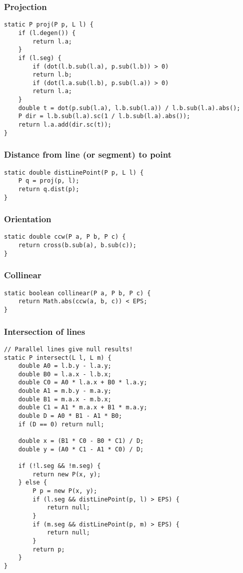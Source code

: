\subsubsection{Projection}
\begin{verbatim}
static P proj(P p, L l) {
	if (l.degen()) {
		return l.a;
	}
	if (l.seg) {
		if (dot(l.b.sub(l.a), p.sub(l.b)) > 0)
		return l.b;
		if (dot(l.a.sub(l.b), p.sub(l.a)) > 0)
		return l.a;
	}
	double t = dot(p.sub(l.a), l.b.sub(l.a)) / l.b.sub(l.a).abs();
	P dir = l.b.sub(l.a).sc(1 / l.b.sub(l.a).abs());
	return l.a.add(dir.sc(t));
}
\end{verbatim}
\subsubsection{Distance from line (or segment) to point}
\begin{verbatim}
static double distLinePoint(P p, L l) {
	P q = proj(p, l);
	return q.dist(p);
}
\end{verbatim}
\subsubsection{Orientation}
\begin{verbatim}
static double ccw(P a, P b, P c) {
	return cross(b.sub(a), b.sub(c));
}
\end{verbatim}
\subsubsection{Collinear}
\begin{verbatim}
static boolean collinear(P a, P b, P c) {
	return Math.abs(ccw(a, b, c)) < EPS;
}
\end{verbatim}
\subsubsection{Intersection of lines}
\begin{verbatim}
// Parallel lines give null results!
static P intersect(L l, L m) {
	double A0 = l.b.y - l.a.y;
	double B0 = l.a.x - l.b.x;
	double C0 = A0 * l.a.x + B0 * l.a.y;
	double A1 = m.b.y - m.a.y;
	double B1 = m.a.x - m.b.x;
	double C1 = A1 * m.a.x + B1 * m.a.y;
	double D = A0 * B1 - A1 * B0;
	if (D == 0)	return null;
	
	double x = (B1 * C0 - B0 * C1) / D;
	double y = (A0 * C1 - A1 * C0) / D;
	
	if (!l.seg && !m.seg) {
		return new P(x, y);
	} else {
		P p = new P(x, y);
		if (l.seg && distLinePoint(p, l) > EPS) {
			return null;
		}
		if (m.seg && distLinePoint(p, m) > EPS) {
			return null;
		}
		return p;
	}
}
\end{verbatim}
